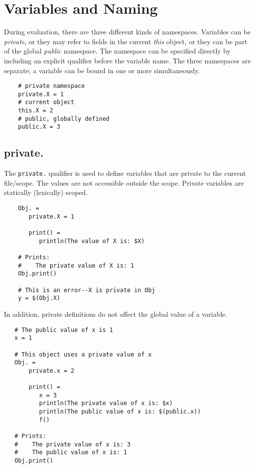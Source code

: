 %
\chapter{Variables and Naming}
\label{chapter:naming}

During evaluation, there are three different kinds of namespaces.  Variables can be \emph{private},
or they may refer to fields in the current \emph{this} object, or they can be part of the global
\emph{public} namespace.  The namespace can be specified directly by including an explicit qualifier
before the variable name.  The three namespaces are separate; a variable can be bound in one or more
simultaneously.

\begin{verbatim}
    # private namespace
    private.X = 1
    # current object
    this.X = 2
    # public, globally defined
    public.X = 3
\end{verbatim}

\section{private.}
\label{section:private}

The \verb+private.+ qualifier is used to define variables that are private to the current file/scope.
The values are not accessible outside the scope.  Private variables are statically (lexically) scoped.

\begin{verbatim}
    Obj. =
       private.X = 1

       print() =
          println(The value of X is: $X)

    # Prints:
    #    The private value of X is: 1
    Obj.print()

    # This is an error--X is private in Obj
    y = $(Obj.X)
\end{verbatim}

In addition, private definitions do not affect the global value of a variable.

\begin{verbatim}
   # The public value of x is 1
   x = 1

   # This object uses a private value of x
   Obj. =
       private.x = 2

       print() =
          x = 3
          println(The private value of x is: $x)
          println(The public value of x is: $(public.x))
          f()

   # Prints:
   #    The private value of x is: 3
   #    The public value of x is: 1
   Obj.print()
\end{verbatim}

